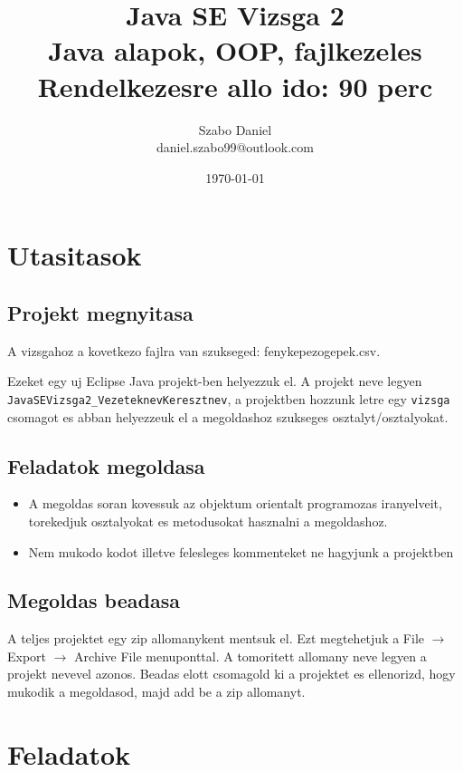 \documentclass{article}
\title{%
Java SE Vizsga 2\\
\large Java alapok, OOP, fajlkezeles\\
\large Rendelkezesre allo ido: 90 perc}
\author{Szabo Daniel\\daniel.szabo99@outlook.com}
\date{\today}
\begin{document}
\maketitle

\section{Utasitasok}

\subsection{Projekt megnyitasa}

A vizsgahoz a kovetkezo fajlra van szukseged: fenykepezogepek.csv.

Ezeket egy uj Eclipse Java projekt-ben helyezzuk el. A projekt neve legyen \lstinline{JavaSEVizsga2_VezeteknevKeresztnev}, a projektben hozzunk letre egy \lstinline{vizsga} csomagot es abban helyezzeuk el a megoldashoz szukseges osztalyt/osztalyokat.

\subsection{Feladatok megoldasa}

\begin{itemize}
    \item A megoldas soran kovessuk az objektum orientalt programozas iranyelveit, torekedjuk osztalyokat es metodusokat hasznalni a megoldashoz.
    \item Nem mukodo kodot illetve felesleges kommenteket ne hagyjunk a projektben
\end{itemize}

\subsection{Megoldas beadasa}

A teljes projektet egy zip allomanykent mentsuk el. Ezt megtehetjuk a File $\rightarrow$ Export $\rightarrow$ Archive File menuponttal. A tomoritett allomany neve legyen a projekt nevevel azonos. Beadas elott csomagold ki a projektet es ellenorizd, hogy mukodik a megoldasod, majd add be a zip allomanyt.

\newpage

\section{Feladatok}
\end{document}
